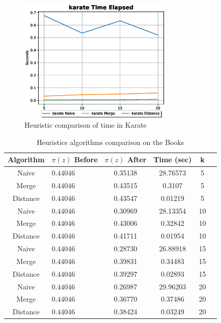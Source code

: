 \begin{figure}[!htbp]
	\centering
	\includegraphics[width=0.65\textwidth]{Figures/karate_time}
	\caption{Heuristic comparison of time in Karate}
	\label{fig:karate_time}
\end{figure}

\begin{table}[htbp]
 \centering
 \caption{Heuristics algorithms comparison on the Books}
 \label{tab:heuristicsKarate}
 \begin{tabular}{|c |l| c | c | c | c ||}
 \hline
  Algorithm & $\pi(z)$ Before &  $\pi(z)$ After & Time (sec) & k\\
  \hline
  \hline
  Naive  & $0.44046$ & 0.35138 &  28.76573&5 \\
  \hline
  Merge & $0.44046$ & 0.43515 &  0.3107&5 \\
  \hline
  Distance &  $0.44046$ & 0.43547 &  0.01219 &5\\
  \hline
  \hline
  Naive &  $0.44046$ & 0.30969 &  28.13354 &10\\
  \hline
  Merge &  $0.44046$ & 0.43006 &  0.32842&10 \\
  \hline
  Distance &  $0.44046$ & 0.41711 &  0.01954&10\\
  \hline
  \hline
  Naive &  $0.44046$ & 0.28730 &  26.88918 &15\\
  \hline
  Merge &  $0.44046$ & 0.39831 &  0.34483&15\\
  \hline
  Distance &  $0.44046$ & 0.39297 &  0.02893&15\\
  \hline
  \hline
  Naive &  $0.44046$ & 0.26987 &  29.96203 &20\\
  \hline
  Merge &  $0.44046$ & 0.36770 &  0.37486&20\\
  \hline
  Distance &  $0.44046$ & 0.38424 &  0.03249&20\\
  \hline
 \end{tabular}
\end{table}

